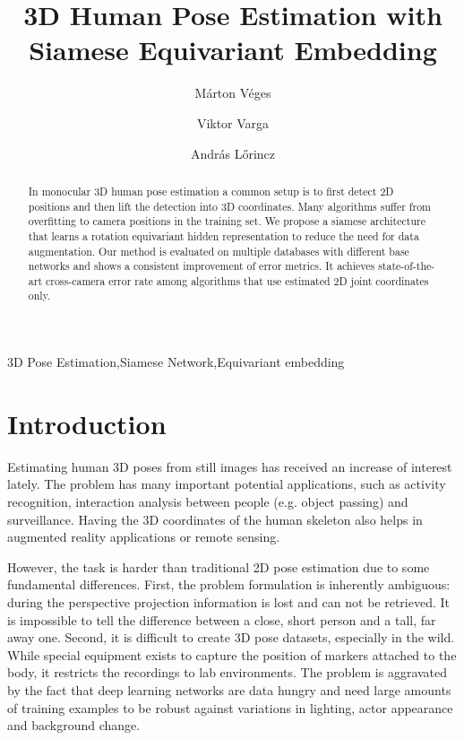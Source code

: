 \documentclass[preprint]{elsarticle}
\begin{document}
\begin{frontmatter}

\title{3D Human Pose Estimation with Siamese Equivariant Embedding}


\author[elte]{M\'arton V\'eges}

\author[elte]{Viktor Varga}
\author[elte]{Andr\'as L\H{o}rincz}

\address[elte]{E\"otv\"os Lor\'and University, Budapest, Hungary}

\begin{abstract}
In monocular 3D human pose estimation a common setup is to first detect 2D positions and then lift the detection into 3D coordinates. Many algorithms suffer from overfitting to camera positions in the training set. We propose a siamese architecture that learns a rotation equivariant hidden representation to reduce the need for data augmentation. Our method is evaluated on multiple databases with different base networks and shows a consistent improvement of error metrics. It achieves state-of-the-art cross-camera error rate among algorithms that use estimated 2D joint coordinates only. 
\end{abstract}

\begin{keyword}
3D Pose Estimation\sep Siamese Network\sep Equivariant embedding 
\end{keyword}

\end{frontmatter}



\section{Introduction}
Estimating human 3D poses from still images has received an increase of interest lately. The problem has many important potential applications, such as activity recognition, interaction analysis between people (e.g. object passing) and surveillance. Having the 3D coordinates of the human skeleton also helps in augmented reality applications or remote sensing.

However, the task is harder than traditional 2D pose estimation due to some fundamental differences. First, the problem formulation is inherently ambiguous: during the perspective projection information is lost and can not be retrieved. It is impossible to tell the difference between a close, short person and a tall, far away one. Second, it is difficult to create 3D pose datasets, especially in the wild. While special equipment exists to capture the position of markers attached to the body, it restricts the recordings to lab environments. The problem is aggravated by the fact that deep learning networks are data hungry and need large amounts of training examples to be robust against variations in lighting, actor appearance and background change.
\end{document}
